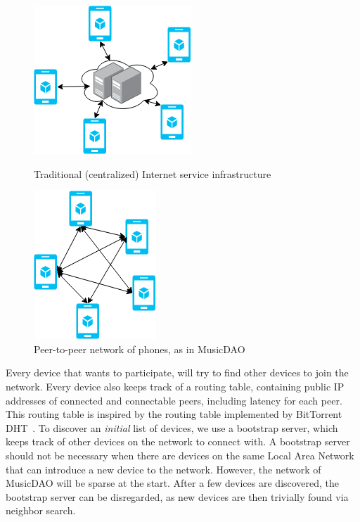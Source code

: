 \begin{figure}
        \centering
        \includegraphics[width=0.6\linewidth]{design/centralized-service.png}
        \caption{Traditional (centralized) Internet service infrastructure}
        \label{fig:centralized-service}
    \endminipage\hfill
        \centering
        \includegraphics[width=0.6\linewidth]{design/decentralized-phones.png}
        \caption{Peer-to-peer network of phones, as in MusicDAO}
        \label{fig:decentralized-phones}
    \endminipage
\end{figure}

Every device that wants to participate, will try to find other devices to join the network. Every device also keeps track of a routing table, containing public IP addresses of connected and connectable peers, including latency for each peer. This routing table is inspired by the routing table implemented by BitTorrent DHT~\citep{bittorrentbep5dht}. To discover an \textit{initial} list of devices, we use a bootstrap server, which keeps track of other devices on the network to connect with. A bootstrap server should not be necessary when there are devices on the same Local Area Network that can introduce a new device to the network. However, the network of MusicDAO will be sparse at the start. After a few devices are discovered, the bootstrap server can be disregarded, as new devices are then trivially found via neighbor search. 


